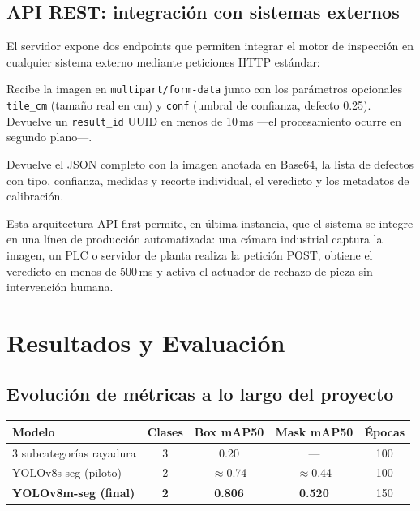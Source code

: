 \documentclass[12pt,a4paper]{article}
\begin{document}
\subsection{API REST: integración con sistemas externos}

El servidor expone dos endpoints que permiten integrar el motor de inspección en
cualquier sistema externo mediante peticiones HTTP estándar:

\begin{description}[leftmargin=2cm,style=nextline]
  \item[\texttt{POST /analyze}]
    Recibe la imagen en \texttt{multipart/form-data} junto con los parámetros
    opcionales \texttt{tile\_cm} (tamaño real en cm) y \texttt{conf} (umbral de
    confianza, defecto 0.25). Devuelve un \texttt{result\_id} UUID en menos de
    10\,ms —el procesamiento ocurre en segundo plano—.

  \item[\texttt{GET /results/\{result\_id\}}]
    Devuelve el JSON completo con la imagen anotada en Base64, la lista de defectos
    con tipo, confianza, medidas y recorte individual, el veredicto y los metadatos
    de calibración.
\end{description}

Esta arquitectura API-first permite, en última instancia, que el sistema se integre
en una línea de producción automatizada: una cámara industrial captura la imagen,
un PLC o servidor de planta realiza la petición POST, obtiene el veredicto en menos
de 500\,ms y activa el actuador de rechazo de pieza sin intervención humana.

\section{Resultados y Evaluación}

\subsection{Evolución de métricas a lo largo del proyecto}

\begin{center}
\begin{tabular}{lcccc}
  \toprule
  \textbf{Modelo} & \textbf{Clases} & \textbf{Box mAP50} & \textbf{Mask mAP50} & \textbf{Épocas} \\
  \midrule
  3 subcategorías rayadura  & 3 & 0.20 & — & 100 \\
  YOLOv8s-seg (piloto)      & 2 & $\approx$0.74 & $\approx$0.44 & 100 \\
  \textbf{YOLOv8m-seg (final)} & \textbf{2} & \textbf{0.806} & \textbf{0.520} & 150 \\
  \bottomrule
\end{tabular}
\end{center}
\end{document}
